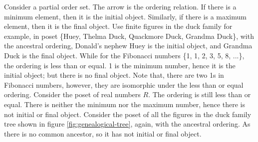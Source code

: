 \documentclass[b5paper]{article}
\begin{document}
\begin{example}
\normalfont
Consider a partial order set. The arrow is the ordering relation. If there is a minimum element, then it is the initial object. Similarly, if there is a maximum element, then it is the final object. Use finite figures in the duck family for example, in poset \{Huey, Thelma Duck, Quackmore Duck, Grandma Duck\}, with the ancestral ordering, Donald's nephew Huey is the initial object, and Grandma Duck is the final object. While for the Fibonacci numbers \{1, 1, 2, 3, 5, 8, ...\}, the ordering is less than or equal. 1 is the minimum number, hence it is the initial object; but there is no final object. Note that, there are two 1s in Fibonacci numbers, however, they are isomorphic under the less than or equal ordering. Consider the poset of real numbers $R$. The ordering is still less than or equal. There is neither the minimum nor the maximum number, hence there is not initial or final object. Consider the poset of all the figures in the duck family tree shown in figure \ref{fig:genealogical-tree}, again, with the ancestral ordering. As there is no common ancestor, so it has not initial or final object.
\end{example}
\end{document}
